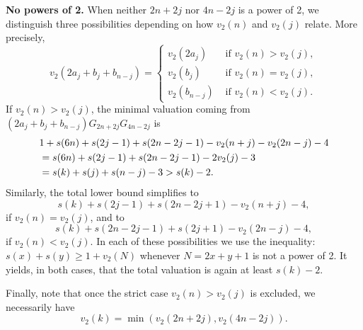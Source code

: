 \documentclass[12pt]{amsart}
\begin{document}
\bigskip

\noindent \textbf{No powers of 2.} When neither $2n+2j$ nor $4n-2j$ is a power of 2, we distinguish three possibilities depending on how $v_2(n)$ and $v_2(j)$ relate. More precisely, 
\[ v_2(2a_j+b_j+b_{n-j})=
	\begin{cases}
		v_2(2a_j) & \text{ if } v_2(n)>v_2(j),\\
		v_2(b_j) & \text{ if } v_2(n)=v_2(j),\\
		v_2(b_{n-j}) & \text{ if } v_2(n)<v_2(j).
	\end{cases}
\]
If $v_2(n)>v_2(j)$, the minimal valuation coming from $(2a_j+b_j+b_{n-j})G_{2n+2j} G_{4n-2j}$ is 
\begin{align*}
& 1+s(6n)+s(2j-1) + s(2n-2j-1) - v_2(n+j) - v_2(2n-j)-4 \notag \\
&=s(6n)+s(2j-1) + s(2n-2j-1) -2v_2(j)-3 \notag \\
&=s(k)+s(j)+s(n-j)-3 > s(k)-2.
\end{align*} 
Similarly, the total lower bound simplifies to 
\[ s(k)+s(2j-1)+s(2n-2j+1)-v_2(n+j)-4,\] if $v_2(n) = v_2(j)$, and to 
\[ s(k)+s(2n-2j-1)+s(2j+1)-v_2(2n-j)-4,\] if $v_2(n) < v_2(j)$. In each of these possibilities we use the inequality: $s(x)+s(y)\ge 1+v_2(N)$ whenever $N=2x+y+1$ is not a power of 2. It yields, in both cases, that the total valuation is again at least $s(k)-2$. 

Finally, note that once the strict case $v_2(n)>v_2(j)$ is excluded, we necessarily have
\[ v_2(k)=\min \left( v_2(2n+2j), v_2(4n-2j) \right).\]




\end{document}
